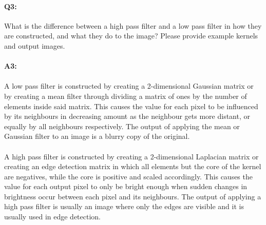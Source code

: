 
\pagebreak
\paragraph{Q3:} What is the difference between a high pass filter and a low pass filter in how they are constructed, and what they do to the image? Please provide example kernels and output images.

\paragraph{A3:}
\paragraph{  }A low pass filter is constructed by creating a 2-dimensional Gaussian matrix or by creating a mean filter through dividing a matrix of ones by the number of elements inside said matrix. This causes the value for each pixel to be influenced by its neighbours in decreasing amount as the neighbour gets more distant, or equally by all neighbours respectively. The output of applying the mean or Gaussian filter to an image is a blurry copy of the original.

\paragraph{  }A high pass filter is constructed by creating a 2-dimensional Laplacian matrix or creating an edge detection matrix in which all elements but the core of the kernel are negatives, while the core is positive and scaled accordingly. This causes the value for each output pixel to only be bright enough when sudden changes in brightness occur between each pixel and its neighbours. The output of applying a high pass filter is usually an image where only the edges are visible and it is usually used in edge detection.

